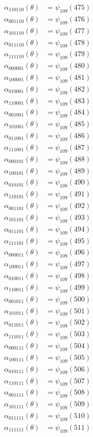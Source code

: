 \begin{align*}
\alpha_{110110}(\theta)&=\psi_{109}(475)\\
\alpha_{001110}(\theta)&=\psi_{109}(476)\\
\alpha_{101110}(\theta)&=\psi_{109}(477)\\
\alpha_{011110}(\theta)&=\psi_{109}(478)\\
\alpha_{111110}(\theta)&=\psi_{109}(479)\\
\alpha_{000001}(\theta)&=\psi_{109}(480)\\
\alpha_{100001}(\theta)&=\psi_{109}(481)\\
\alpha_{010001}(\theta)&=\psi_{109}(482)\\
\alpha_{110001}(\theta)&=\psi_{109}(483)\\
\alpha_{001001}(\theta)&=\psi_{109}(484)\\
\alpha_{101001}(\theta)&=\psi_{109}(485)\\
\alpha_{011001}(\theta)&=\psi_{109}(486)\\
\alpha_{111001}(\theta)&=\psi_{109}(487)\\
\alpha_{000101}(\theta)&=\psi_{109}(488)\\
\alpha_{100101}(\theta)&=\psi_{109}(489)\\
\alpha_{010101}(\theta)&=\psi_{109}(490)\\
\alpha_{110101}(\theta)&=\psi_{109}(491)\\
\alpha_{001101}(\theta)&=\psi_{109}(492)\\
\alpha_{101101}(\theta)&=\psi_{109}(493)\\
\alpha_{011101}(\theta)&=\psi_{109}(494)\\
\alpha_{111101}(\theta)&=\psi_{109}(495)\\
\alpha_{000011}(\theta)&=\psi_{109}(496)\\
\alpha_{100011}(\theta)&=\psi_{109}(497)\\
\alpha_{010011}(\theta)&=\psi_{109}(498)\\
\alpha_{110011}(\theta)&=\psi_{109}(499)\\
\alpha_{001011}(\theta)&=\psi_{109}(500)\\
\alpha_{101011}(\theta)&=\psi_{109}(501)\\
\alpha_{011011}(\theta)&=\psi_{109}(502)\\
\alpha_{111011}(\theta)&=\psi_{109}(503)\\
\alpha_{000111}(\theta)&=\psi_{109}(504)\\
\alpha_{100111}(\theta)&=\psi_{109}(505)\\
\alpha_{010111}(\theta)&=\psi_{109}(506)\\
\alpha_{110111}(\theta)&=\psi_{109}(507)\\
\alpha_{001111}(\theta)&=\psi_{109}(508)\\
\alpha_{101111}(\theta)&=\psi_{109}(509)\\
\alpha_{011111}(\theta)&=\psi_{109}(510)\\
\alpha_{111111}(\theta)&=\psi_{109}(511)\\
\end{align*}
